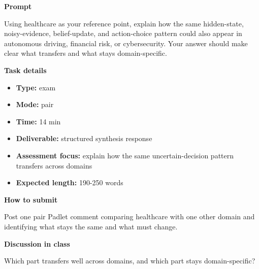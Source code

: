 \documentclass[11pt]{article}
\begin{document}
\begin{tcolorbox}[colback=white,colframe=MidnightBlue,title={Q5 Exam-Style Constructed Response},fonttitle=\bfseries,breakable]
\begin{center}
\end{center}

{\large\bfseries\color{MidnightBlue} Prompt}\par\medskip
Using healthcare as your reference point, explain how the same hidden-state, noisy-evidence, belief-update, and action-choice pattern could also appear in autonomous driving, financial risk, or cybersecurity. Your answer should make clear what transfers and what stays domain-specific.

{\large\bfseries\color{MidnightBlue} Task details}\par\medskip
\begin{itemize}\item \textbf{Type:} exam
\item \textbf{Mode:} pair
\item \textbf{Time:} 14 min
\item \textbf{Deliverable:} structured synthesis response
\item \textbf{Assessment focus:} explain how the same uncertain-decision pattern transfers across domains
\item \textbf{Expected length:} 190-250 words\end{itemize}

{\large\bfseries\color{MidnightBlue} How to submit}\par\medskip
Post one pair Padlet comment comparing healthcare with one other domain and identifying what stays the same and what must change.

{\large\bfseries\color{MidnightBlue} Discussion in class}\par\medskip
Which part transfers well across domains, and which part stays domain-specific?


\end{tcolorbox}
\end{document}

